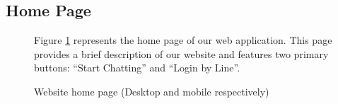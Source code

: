 \documentclass[12pt,oneside,openright,a4paper]{cpe-english-project}
\begin{document}
    \subsection{Home Page}
    \begin{figure}[!h]
      \centering
      \begin{minipage}{.5\textwidth}
        \centering
      \end{minipage}%
      \begin{minipage}{.3\textwidth}
        \centering
      \end{minipage}
      \caption{Website home page (Desktop and mobile respectively)}\label{fig:HomePage}
      \begin{justify}
        \qquad Figure \ref{fig:HomePage} represents the home page of our web application. This page provides a brief description of our website and features two primary buttons: “Start Chatting” and “Login by Line”.

\end{justify}
\end{figure}
\end{document}
